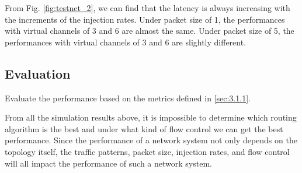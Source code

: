 From Fig. \ref{fig:testnet_2}, we can find that the latency is always increasing with the increments of the injection rates. Under packet size of 1, the performances with virtual channels of 3 and 6 are almost the same. Under packet size of 5, the performances with virtual channels of 3 and 6 are slightly different.

\subsection{Evaluation}
Evaluate the performance based on the metrics defined in \ref{sec:3.1.1}.

From all the simulation results above, it is impossible to determine which routing algorithm is the best and under what kind of flow control we can get the best performance. Since the performance of a network system not only depends on the topology itself, the traffic patterns, packet size, injection rates, and flow control will all impact the performance of such a network system.

